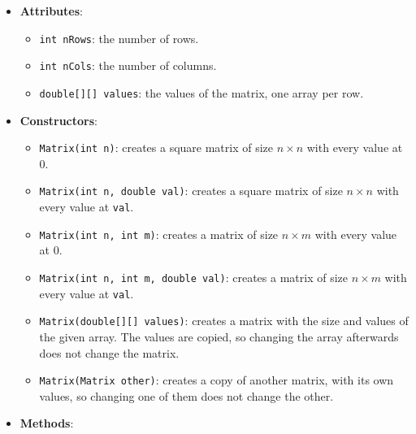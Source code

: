\begin{itemize}

    \item \textbf{Attributes}:

        \begin{itemize}

            \item \texttt{int nRows}: the number of rows.

            \item \texttt{int nCols}: the number of columns.

            \item \texttt{double[][] values}: the values of the matrix, one array per row.

        \end{itemize}

    \item \textbf{Constructors}:

        \begin{itemize}

            \item \texttt{Matrix(int n)}: creates a square matrix of size \(n \times n\) with every value at 0.

            \item \texttt{Matrix(int n, double val)}: creates a square matrix of size \(n \times n\) with every value at \texttt{val}.

            \item \texttt{Matrix(int n, int m)}: creates a matrix of size \(n \times m\) with every value at 0.

            \item \texttt{Matrix(int n, int m, double val)}: creates a matrix of size \(n \times m\) with every value at \texttt{val}.

            \item \texttt{Matrix(double[][] values)}: creates a matrix with the size and values of the given array. The values are copied, so changing the array afterwards does not change the matrix.

            \item \texttt{Matrix(Matrix other)}: creates a copy of another matrix, with its own values, so changing one of them does not change the other.

        \end{itemize}

    \item \textbf{Methods}:


\end{itemize}
